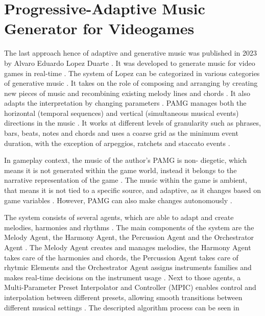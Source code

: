 \section{Progressive-Adaptive Music Generator for Videogames}

The last approach hence of adaptive and generative music
was published in 2023 by Alvaro Eduardo Lopez Duarte \cite{lopez2023progressive}.
It was developed to generate music for 
video games in real-time \cite{lopez2023progressive}.
The system of Lopez can be categorized in various categories of generative music \cite{lopez2023progressive}. It takes on the role of composing and arranging by creating new pieces of music and recombining existing melody lines and chords \cite{lopez2023progressive}. It also adapts the interpretation by changing parameters \cite{lopez2023progressive}. PAMG manages both the horizontal (temporal sequences) and vertical (simultaneous musical events) directions in the music \cite{lopez2023progressive}. It works at different levels of granularity such as phrases, bars, beats, notes and chords and uses a coarse grid as the minimum event duration, with the exception of arpeggios, ratchets and staccato events \cite{lopez2023progressive}.

In gameplay context, the music of the author's PAMG is non-
diegetic, which means it is not generated within the game 
world,
instead it belongs to the narrative representation of the
game \cite{lopez2023progressive}. The music within the game is ambient, that means it is
not tied to a specific source, and adaptive, as it changes 
based on game variables \cite{lopez2023progressive}. However, PAMG can also make changes
autonomously \cite{lopez2023progressive}.

The system consists of several agents, which are able to
adapt and create melodies, harmonies and rhythms 
\cite{lopez2023progressive}. The main components of 
the system are the Melody Agent, the Harmony Agent, the 
Percussion Agent and the Orchestrator Agent
\cite{lopez2023progressive}. The Melody Agent creates
and manages melodies, the Harmony Agent takes care of
the harmonies and chords, the Percussion Agent takes care
of rhytmic Elements and the Orchestrator Agent assigns
instruments families and makes real-time decisions on the
instrument usage \cite{lopez2023progressive}. Next to those
agents, a Multi-Parameter Preset Interpolator and Controller
(MPIC) enables control and interpolation between different 
presets, allowing smooth transitions between different 
musical settings \cite{lopez2023progressive}. The descripted
algorithm process can be seen in 

